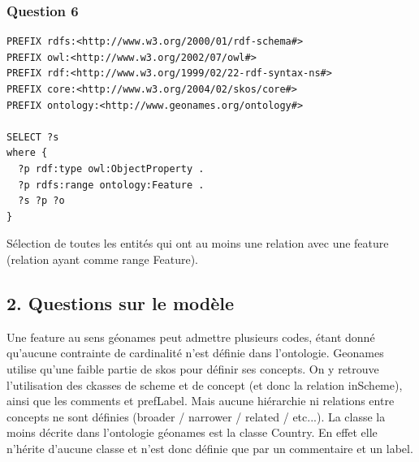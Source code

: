 \subsubsection{Question 6}
\begin{verbatim}
PREFIX rdfs:<http://www.w3.org/2000/01/rdf-schema#>
PREFIX owl:<http://www.w3.org/2002/07/owl#>
PREFIX rdf:<http://www.w3.org/1999/02/22-rdf-syntax-ns#>
PREFIX core:<http://www.w3.org/2004/02/skos/core#>
PREFIX ontology:<http://www.geonames.org/ontology#>

SELECT ?s
where {
  ?p rdf:type owl:ObjectProperty .
  ?p rdfs:range ontology:Feature .
  ?s ?p ?o
}
\end{verbatim}
Sélection de toutes les entités qui ont au moins une relation avec une feature (relation ayant comme range Feature).

\subsection{2. Questions sur le modèle}

    Une feature au sens géonames peut admettre plusieurs codes, étant donné qu'aucune contrainte de cardinalité n'est définie dans l'ontologie.
    Geonames utilise qu'une faible partie de skos pour définir ses concepts. On y retrouve l'utilisation des ckasses de scheme et de concept (et donc la relation inScheme), ainsi que les comments et prefLabel. Mais aucune hiérarchie ni relations entre concepts ne sont définies (broader / narrower / related / etc...).
    La classe la moins décrite dans l'ontologie géonames est la classe Country. En effet elle n'hérite d'aucune classe et n'est donc définie que par un commentaire et un label.
